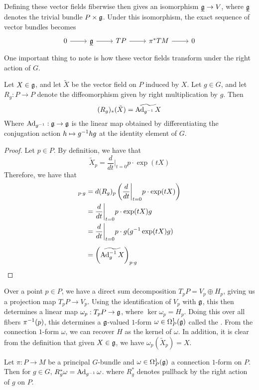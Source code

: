 Defining these vector fields fiberwise  then gives an isomorphism $
\underline{\mathfrak{g}} \to V$, where $\underline{\mathfrak{g}}$ denotes the trivial bundle
$P \times \mathfrak{g}$. Under this isomorphism, the exact sequence of vector bundles becomes
\[\begin{tikzcd}
0 \ar[r] & \underline{\g} \ar[r] & TP \ar[r] & \pi^*TM \ar[r] & 0
\end{tikzcd}\]
One important thing to note is how these vector fields transform under the
right action of $G$.
%
\begin{prop}
Let $X \in \mathfrak{g}$, and let $\tilde{X}$ be the vector field on $P$ induced by
$X$. Let $g \in G$, and let $R_g : P \to P$ denote the diffeomorphism given
by right multiplication by $g$. Then
\[
(R_g)_*(\tilde{X}) = \widetilde{\operatorname{Ad}_{g^{-1}} X}
\]
Where $\operatorname{Ad}_{g^{-1}} : \mathfrak{g} \to \mathfrak{g}$ is the linear map obtained by differentiating the
conjugation action $h \mapsto g^{-1} h g$ at the identity element of $G$.
\end{prop}
%
\begin{proof}
Let $p \in P$. By definition, we have that
\[
\tilde{X}_p = \frac{d}{dt}\bigg\vert_{t=0} p \cdot \exp(tX)
\]
Therefore, we have that
\begin{align*}
[(R_g)_*(\tilde{X})]_{p\cdot g} &=
d(R_g)_p\left( \frac{d}{dt}\bigg\vert_{t = 0} p\cdot \exp(tX) \right) \\
&= \frac{d}{dt}\bigg\vert_{t = 0} p \cdot \exp(tX)g \\
&= \frac{d}{dt}\bigg\vert_{t = 0}p \cdot g (g\inv \exp(tX)g) \\[5pt]
&= \left( \widetilde{\Ad_g\inv X} \right)_{p \cdot g}
\end{align*}
\end{proof}
%
Over a point $p \in P$, we have a direct sum decomposition $T_pP = V_p \oplus H_p$,
giving us a projection map $T_pP \to V_p$. Using the identification of $V_p$
with $\mathfrak{g}$, this then determines a linear map $ \omega_p : T_pP \to \mathfrak{g}$, where
$\ker\omega_p = H_p$. Doing this over all fibers $\pi^{-1}(p)$, this determines
a $\mathfrak{g}$-valued $1$-form $\omega \in \Omega^1_P(\mathfrak{g})$ called the
. From the connection $1$-form $\omega$, we can recover
$H$ as the kernel of $\omega$. In addition, it is clear from the definition that
given $X \in \mathfrak{g}$, we have $\omega_p(\tilde{X}_p) = X$.
%
\begin{prop}
Let $\pi : P \to M$ be a principal $G$-bundle and $\omega \in \Omega^1_P(\mathfrak{g})$ a
connection $1$-form on $P$. Then for $g \in G$, $R_g^*\omega = \operatorname{Ad}_{g^{-1}}\omega$.
where $R_g^*$ denotes pullback by the right action of $g$ on $P$.
\end{prop}
